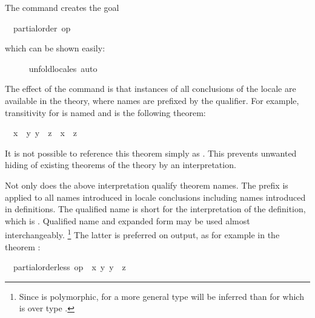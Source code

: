 \begin{isabellebody}
\begin{isamarkuptxt}
  The command creates the goal
  \begin{isabelle}%
\ {}{\isachardot}\ partial{\isacharunderscore}order\ op\ {\isasymle}%
\end{isabelle} which can be shown easily:%
\end{isamarkuptxt}%
\isamarkuptrue%
\ \ \ \ \isamarkupfalse%
\ unfold{\isacharunderscore}locales\ auto%
\endisatagvisible
{\isafoldvisible}%
%
\isadelimvisible
%
\endisadelimvisible
%
\begin{isamarkuptext}%
The effect of the command is that instances of all
  conclusions of the locale are available in the theory, where names
  are prefixed by the qualifier.  For example, transitivity for  is named  and is the following
  theorem:
  \begin{isabelle}%
\ \ {\isasymlbrakk}{\isacharquery}x\ {\isasymle}\ {\isacharquery}y{\isacharsemicolon}\ {\isacharquery}y\ {\isasymle}\ {\isacharquery}z{\isasymrbrakk}\ {\isasymLongrightarrow}\ {\isacharquery}x\ {\isasymle}\ {\isacharquery}z%
\end{isabelle}
  It is not possible to reference this theorem simply as .  This prevents unwanted hiding of existing theorems of the
  theory by an interpretation.%
\end{isamarkuptext}%
\isamarkuptrue%
%
\isamarkuptrue%
%
\begin{isamarkuptext}%
Not only does the above interpretation qualify theorem names.
  The prefix  is applied to all names introduced in locale
  conclusions including names introduced in definitions.  The
  qualified name  is short for
  the interpretation of the definition, which is .
  Qualified name and expanded form may be used almost
  interchangeably.%
\footnote{Since  is polymorphic, for  a
  more general type will be inferred than for  which
  is over type .}
  The latter is preferred on output, as for example in the theorem
  : \begin{isabelle}%
\ \ {\isasymlbrakk}partial{\isacharunderscore}order{\isachardot}less\ op\ {\isasymle}\ {\isacharquery}x\ {\isacharquery}y{\isacharsemicolon}\ {\isacharquery}y\ {\isasymle}\ {\isacharquery}z{\isasymrbrakk}\isanewline

\end{isabelle}
\end{isamarkuptext}
\end{isabellebody}
